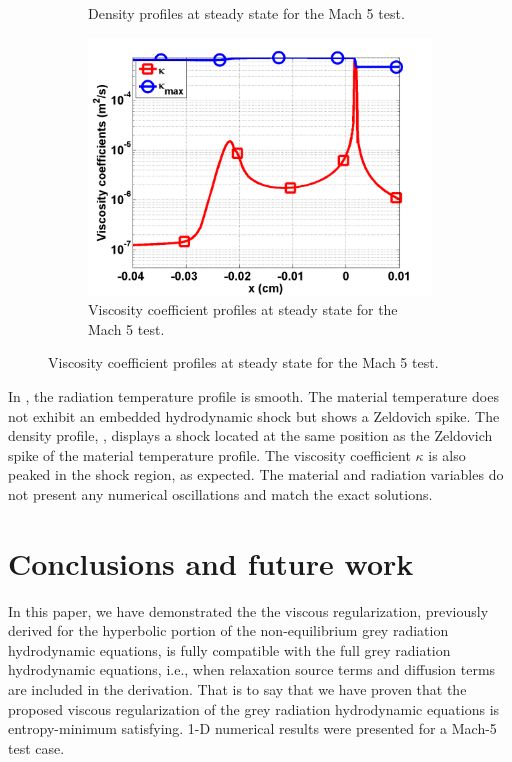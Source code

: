 \documentclass{mc2015}
\begin{document}
\begin{figure}[H]
\begin{subfigure}[b]{0.47\textwidth}
        \caption{Density profiles at steady state for the Mach 5 test.}\label{fig:Mach5_dens}
\end{subfigure}
\begin{subfigure}[b]{0.47\textwidth}
                \centering
                \includegraphics[width=\textwidth]{figs/Mach_5_nel_500_viscosity.png}
        \caption{Viscosity coefficient profiles at steady state for the Mach 5 test.}\label{fig:Mach5_visc}
\end{subfigure}
\end{figure}
%
In , the radiation temperature profile is smooth. The material temperature does not exhibit an embedded hydrodynamic shock but shows a Zeldovich spike. The density profile, , displays a shock located at the same position as the Zeldovich spike of the material temperature profile. The viscosity coefficient $\kappa$ is also peaked in the shock region, as expected. The material and radiation variables do not present any numerical oscillations and match the exact solutions.
%
\section{Conclusions and future work}\label{sec:conclusion}
%
In this paper, we have demonstrated the the viscous regularization, previously derived
for the hyperbolic portion of the non-equilibrium grey radiation hydrodynamic equations,
is fully compatible with the full grey radiation hydrodynamic equations, i.e., when
relaxation source terms and diffusion terms are included in the derivation. That is to say that we have
proven that the proposed viscous regularization of the grey radiation hydrodynamic equations
is entropy-minimum satisfying. 1-D numerical results were presented for a Mach-5 test case.
\end{document}
